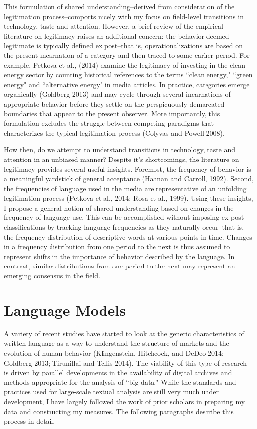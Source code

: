This formulation of shared understanding--derived from consideration of the legitimation process--comports nicely with my focus on field-level transitions in technology, taste and attention. However, a brief review of the empirical literature on legitimacy raises an additional concern: the behavior deemed legitimate is typically defined ex post--that is, operationalizations are based on the present incarnation of a category and then traced to some earlier period. For example, Petkova et al., (2014) examine the legitimacy of investing in the clean energy sector by counting historical references to the terms ``clean energy," ``green energy" and ``alternative energy" in media articles. In practice, categories emerge organically (Goldberg 2013) and may cycle through several incarnations of appropriate behavior before they settle on the perspicuously demarcated boundaries that appear to the present observer. More importantly, this formulation excludes the struggle between competing paradigms that characterizes the typical legitimation process (Colyvas and Powell 2008).

How then, do we attempt to understand transitions in technology, taste and attention in an unbiased manner? Despite it's shortcomings, the literature on legitimacy provides several useful insights. Foremost, the frequency of  behavior is a meaningful yardstick of general acceptance (Hannan and Carroll, 1992). Second, the frequencies of language used in the media are representative of an unfolding legitimation process (Petkova et al., 2014; Rosa et al., 1999). Using these insights, I propose a general notion of shared understanding based on changes in the frequency of language use. This can be accomplished without imposing ex post classifications by tracking language frequencies as they naturally occur--that is, the frequency distribution of descriptive words at various points in time. Changes in a frequency distribution from one period to the next is thus assumed to represent shifts in the importance of behavior described by the language. In contrast, similar distributions from one period to the next may represent an emerging consensus in the field. 

\section{Language Models}

A variety of recent studies have started to look at the generic characteristics of written language as a way to understand the structure of markets and the evolution of human behavior (Klingenstein, Hitchcock, and DeDeo 2014; Goldberg 2013; Tirunillai and Tellis 2014). The viability of this type of research is driven by parallel developments in the availability of digital archives and methods appropriate for the analysis of ``big data." While the standards and practices used for large-scale textual analysis are still very much under development, I have largely followed the work of prior scholars in preparing my data and constructing my measures. The following paragraphs describe this process in detail.

